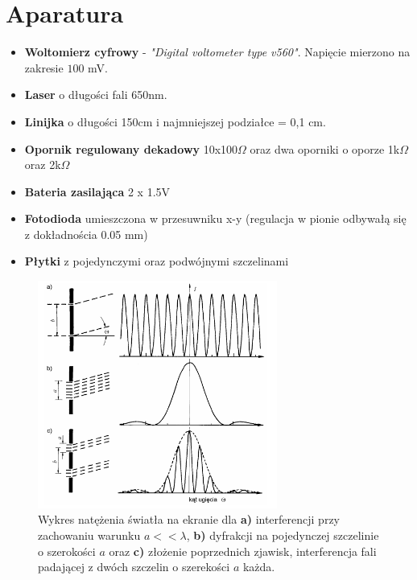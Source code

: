 \documentclass{article}
\begin{document}
\section{Aparatura}
\begin{itemize}
	\item \textbf{Woltomierz cyfrowy} - \textit{"Digital voltometer type v560"}. Napięcie mierzono na zakresie $100$ mV. %
	\item \textbf{Laser} o długości fali 650nm.
	\item \textbf{Linijka} o długości 150cm i najmniejszej podziałce = 0,1 cm.
	\item \textbf{Opornik regulowany dekadowy} 10x100$\Omega$ oraz dwa oporniki o oporze 1k$\Omega$ oraz 2k$\Omega$
	\item \textbf{Bateria zasilająca} 2 x 1.5V
	\item \textbf{Fotodioda} umieszczona w przesuwniku x-y (regulacja w pionie odbywałą się z dokładnościa 0.05 mm)
	\item \textbf{Płytki} z pojedynczymi oraz podwójnymi szczelinami
	
		
\end{itemize}
\begin{figure}[h!]
	\centering
	\includegraphics[width=0.7\textwidth]{images/prazki.png}
	\caption{Wykres natężenia światła na ekranie dla \textbf{a)} interferencji przy zachowaniu warunku $a<<\lambda$, \textbf{b)} dyfrakcji na pojedynczej szczelinie o szerokości $a$ oraz \textbf{c)} złożenie poprzednich zjawisk, interferencja fali padającej z dwóch szczelin o szerekości $a$ każda.\cite{1}}
	\label{rysunki_prazkow}
\end{figure}
\end{document}
